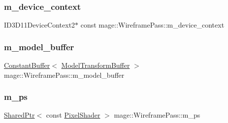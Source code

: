 \hypertarget{classmage_1_1_wireframe_pass_aa3e85e2688c424fc369da6c00691d466}{}\label{classmage_1_1_wireframe_pass_aa3e85e2688c424fc369da6c00691d466} 
\subsubsection{\texorpdfstring{m\+\_\+device\+\_\+context}{m\_device\_context}}
{\footnotesize\ttfamily I\+D3\+D11\+Device\+Context2$\ast$ const mage\+::\+Wireframe\+Pass\+::m\+\_\+device\+\_\+context\hspace{0.3cm}{\ttfamily [private]}}

\hypertarget{classmage_1_1_wireframe_pass_a1aa27e1ce7b07c2bf9e4146717d84b42}{}\label{classmage_1_1_wireframe_pass_a1aa27e1ce7b07c2bf9e4146717d84b42} 
\subsubsection{\texorpdfstring{m\+\_\+model\+\_\+buffer}{m\_model\_buffer}}
{\footnotesize\ttfamily \hyperlink{structmage_1_1_constant_buffer}{Constant\+Buffer}$<$ \hyperlink{structmage_1_1_model_transform_buffer}{Model\+Transform\+Buffer} $>$ mage\+::\+Wireframe\+Pass\+::m\+\_\+model\+\_\+buffer\hspace{0.3cm}{\ttfamily [private]}}

\hypertarget{classmage_1_1_wireframe_pass_a2da40456136a7df9926d2672bcf6b5c2}{}\label{classmage_1_1_wireframe_pass_a2da40456136a7df9926d2672bcf6b5c2} 
\subsubsection{\texorpdfstring{m\+\_\+ps}{m\_ps}}
{\footnotesize\ttfamily \hyperlink{namespacemage_a1e01ae66713838a7a67d30e44c67703e}{Shared\+Ptr}$<$ const \hyperlink{namespacemage_ac98506b7edd999ea43ec46fbd0330238}{Pixel\+Shader} $>$ mage\+::\+Wireframe\+Pass\+::m\+\_\+ps\hspace{0.3cm}{\ttfamily [private]}}

